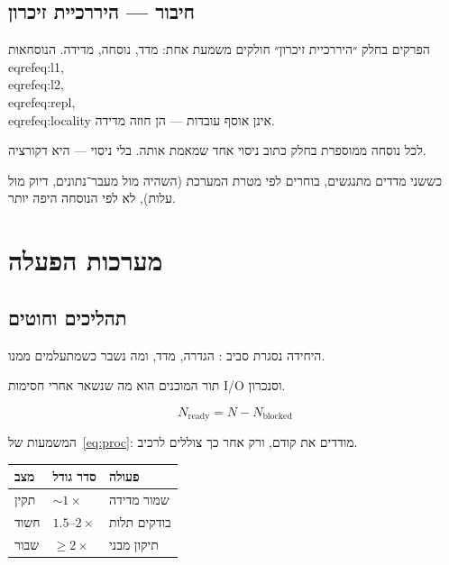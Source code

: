 \chapter{חיבור — היררכיית זיכרון}
\label{ch:bridge-l1}

הפרקים בחלק ״היררכיית זיכרון״ חולקים משמעת אחת: מדד, נוסחה, מדידה.
הנוסחאות \\eqref{eq:l1}, \\eqref{eq:l2}, \\eqref{eq:repl}, \\eqref{eq:locality} אינן אוסף עובדות — הן חוזה מדידה.

\begin{keybox}[frametitle={חוזה החלק}]
לכל נוסחה ממוספרת בחלק כתוב ניסוי אחד שמאמת אותה. בלי ניסוי — היא דקורציה.
\end{keybox}

כששני מדדים מתנגשים, בוחרים לפי מטרת המערכת (השהיה מול מעבר־נתונים, דיוק מול עלות),
לא לפי הנוסחה היפה יותר.

\part{מערכות הפעלה}

\chapter{תהליכים וחוטים}
\label{ch:proc}

היחידה נסגרת סביב : הגדרה, מדד, ומה נשבר כשמתעלמים ממנו.

\begin{defbox}[frametitle={הגדרה — תהליכים וחוטים}]
תור המוכנים הוא מה שנשאר אחרי חסימות I/O וסנכרון.
\end{defbox}

\begin{equation}
\label{eq:proc}
N_{\mathrm{ready}} = N - N_{\mathrm{blocked}}
\end{equation}

המשמעות של~\eqref{eq:proc}: מודדים את  קודם, ורק אחר כך צוללים לרכיב.

\begin{tablebox}\centering\small
\begin{tabular}{@{}lll@{}}
\toprule
\textbf{מצב} & \textbf{סדר גודל} & \textbf{פעולה}\\
\midrule
תקין & $\sim 1\times$ & שמור מדידה\\
חשוד & $1.5$–$2\times$ & בודקים תלות\\
שבור & $\ge 2\times$ & תיקון מבני\\
\bottomrule
\end{tabular}
\end{tablebox}

